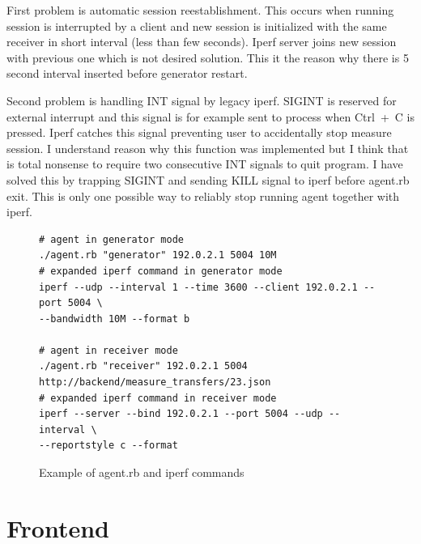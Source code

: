 First problem is automatic session reestablishment. This occurs when running session is interrupted by a client and new session is initialized with the same receiver in short interval (less than few seconds). Iperf server joins new session with previous one which is not desired solution. This it the reason why there is 5 second interval inserted before generator restart. 

Second problem is handling INT signal by legacy iperf. SIGINT is reserved for external interrupt and this signal is for example sent to process when \mbox{Ctrl + C} is pressed. Iperf catches this signal preventing user to accidentally stop measure session. I understand reason why this function was implemented but I think that is total nonsense to require two consecutive INT signals to quit program. I have solved this by trapping SIGINT and sending KILL signal to iperf before agent.rb exit. This is only one possible way to reliably stop running agent together with iperf.

\begin{figure}[htb]
\caption{Example of agent.rb and iperf commands}
\label{code:fw}
\begin{verbatim}
# agent in generator mode
./agent.rb "generator" 192.0.2.1 5004 10M
# expanded iperf command in generator mode
iperf --udp --interval 1 --time 3600 --client 192.0.2.1 --port 5004 \
--bandwidth 10M --format b
	
# agent in receiver mode
./agent.rb "receiver" 192.0.2.1 5004 http://backend/measure_transfers/23.json
# expanded iperf command in receiver mode
iperf --server --bind 192.0.2.1 --port 5004 --udp --interval \
--reportstyle c --format
\end{verbatim}
\end{figure}


\section{Frontend}



